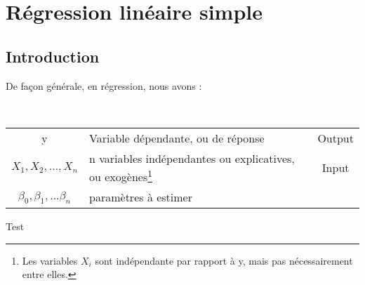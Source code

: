 \chapter{Régression linéaire simple}

\section{Introduction}

De façon générale, en régression, nous avons :

\\
\begin{tabularx}{\linewidth}{c|X|c}
\hline
y & Variable dépendante, ou de réponse & Output \\
$X_1, X_2, ..., X_n$ & n variables indépendantes ou explicatives, ou exogènes\footnote{Les variables $X_i$ sont indépendante par rapport à y, mais pas nécessairement entre elles.} & Input \\
$\beta_0, \beta_1, ... \beta_n$ & paramètres à estimer
\hline
\end{tabularx}

Test